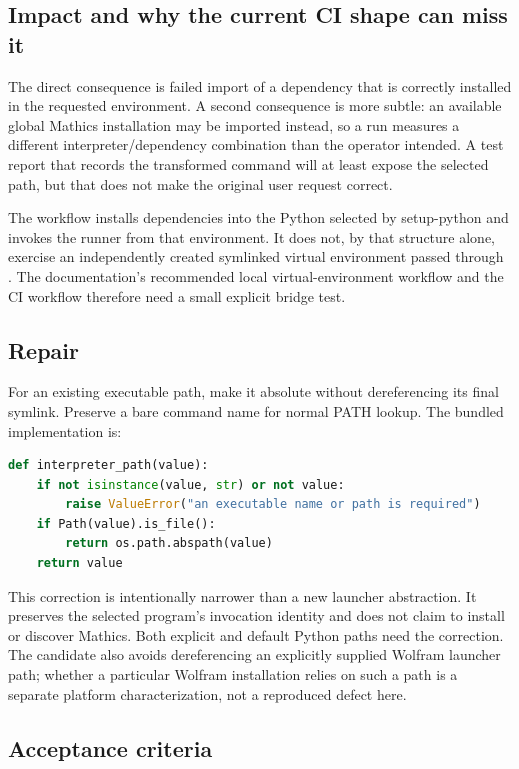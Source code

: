 \documentclass[11pt,letterpaper]{article}
\newcommand{\code}[1]{\texttt{\detokenize{#1}}}
\begin{document}
\subsection{Impact and why the current CI shape can miss it}

The direct consequence is failed import of a dependency that is correctly installed in the requested environment. A second consequence is more subtle: an available global Mathics installation may be imported instead, so a run measures a different interpreter/dependency combination than the operator intended. A test report that records the transformed command will at least expose the selected path, but that does not make the original user request correct.

The workflow installs dependencies into the Python selected by setup-python and invokes the runner from that environment. It does not, by that structure alone, exercise an independently created symlinked virtual environment passed through \code{--python}. The documentation's recommended local virtual-environment workflow and the CI workflow therefore need a small explicit bridge test.~\cite{workflow,mathicsguide}

\subsection{Repair}

For an existing executable path, make it absolute without dereferencing its final symlink. Preserve a bare command name for normal PATH lookup. The bundled implementation is:
\begin{lstlisting}[language=Python]
def interpreter_path(value):
    if not isinstance(value, str) or not value:
        raise ValueError("an executable name or path is required")
    if Path(value).is_file():
        return os.path.abspath(value)
    return value
\end{lstlisting}

This correction is intentionally narrower than a new launcher abstraction. It preserves the selected program's invocation identity and does not claim to install or discover Mathics. Both explicit and default Python paths need the correction. The candidate also avoids dereferencing an explicitly supplied Wolfram launcher path; whether a particular Wolfram installation relies on such a path is a separate platform characterization, not a reproduced defect here.

\subsection{Acceptance criteria}
\end{document}
